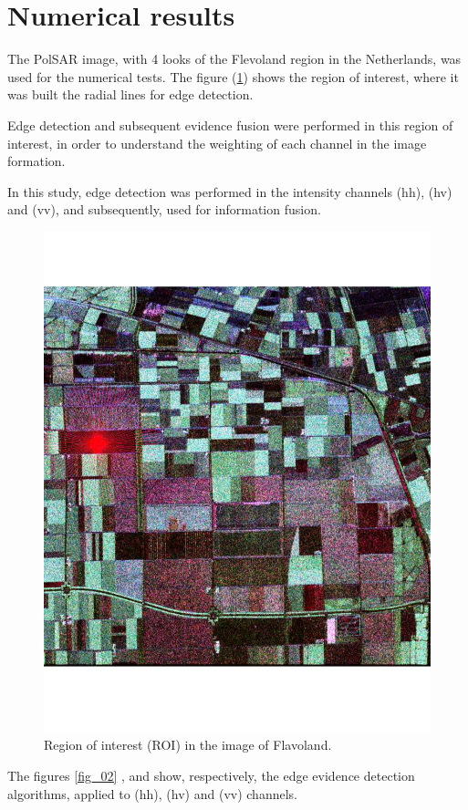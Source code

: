 \documentclass[conference]{IEEEtran}
\begin{document}
{{{{\section{Numerical results}\label{sec_07}
The PolSAR image, with 4 looks of the Flevoland region in the Netherlands, was used for the numerical tests. The figure (\ref{fig_01}) shows the region of interest, where it was built the radial lines for edge detection.

 Edge detection and subsequent evidence fusion were performed in this region of interest, in order to understand the weighting of each channel in the image formation.

In this study, edge detection was performed in the intensity channels (hh), (hv) and (vv), and subsequently, used for information fusion. 

\begin{figure}[hbt]
\centering
	\includegraphics[scale=0.3]{flevoland_radial_4_look.pdf}
			\vspace{-1.0cm}
	\caption{Region of interest (ROI) in the image of Flavoland.}
\label{fig_01}
\end{figure}
The figures \ref{fig_02} ,  and  show, respectively, the edge evidence detection algorithms, applied to (hh), (hv) and (vv) channels. 

}}}}
\end{document}
